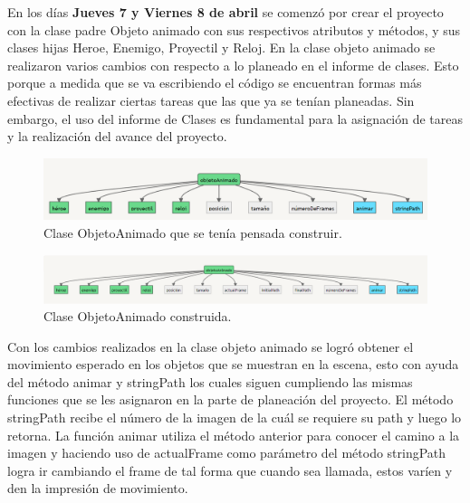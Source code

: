 \documentclass{article}
\begin{document}
En los días \textbf{Jueves 7 y Viernes 8 de abril} se comenzó por crear el proyecto con la clase padre Objeto animado con sus respectivos atributos y métodos, y sus clases hijas Heroe, Enemigo, Proyectil y Reloj.
En la clase objeto animado se realizaron varios cambios con respecto a lo planeado en el informe de clases. Esto porque a medida que se va escribiendo el código se encuentran formas más efectivas de realizar ciertas tareas que las que ya se tenían planeadas. Sin embargo, el uso del informe de Clases es fundamental para la asignación de tareas y la realización del avance del proyecto.

\begin{figure}[h]
\includegraphics[scale=0.5]{Images/ObjetoAnimado.png}
\centering
\caption{Clase ObjetoAnimado que se tenía pensada construir.}
\label{fig:objetoAnimado}
\end{figure}

\begin{figure}[h]
\includegraphics[scale=0.6]{Images/newObjetoanimado.png}
\centering
\caption{Clase ObjetoAnimado construida.}
\label{fig:newobjetoAnimado}
\end{figure}

Con los cambios realizados en la clase objeto animado se logró obtener el movimiento esperado en los objetos que se muestran en la escena, esto con ayuda del método animar y stringPath los cuales siguen cumpliendo las mismas funciones que se les asignaron en la parte de planeación del proyecto. El método stringPath recibe el número de la imagen de la cuál se requiere su path y luego lo retorna. La función animar utiliza el método anterior para conocer el camino a la imagen y haciendo uso de actualFrame como parámetro del método stringPath logra ir cambiando el frame de tal forma que cuando sea llamada, estos varíen y den la impresión de movimiento.
\end{document}
